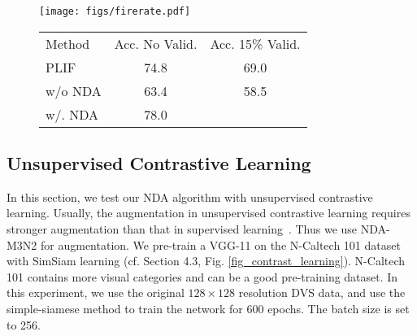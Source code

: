 \documentclass[runningheads]{llncs}
\newcommand{\bftab}{\fontseries{b}\selectfont}
\begin{document}
\begin{figure}[t]
\noindent\begin{minipage}{\textwidth}
\begin{minipage}{0.49\textwidth}
\centering
\texttt{[image: figs/firerate.pdf]}
\label{fig_fire}
\end{minipage}
\hfill
\begin{minipage}{0.49\textwidth}
\centering
{}
\centering
\begin{adjustbox}{max width=\linewidth}
\begin{tabular}[b]{l  c  c} 
\toprule
{{\bftab Method}} & {\bftab Acc. No Valid.} & {\bftab Acc. 15\% Valid.} \\
\noalign{\smallskip}
\hline
\noalign{\smallskip}
PLIF \cite{fang2021incorporating} & 74.8 & 69.0 \\ 
\noalign{\smallskip}
\hline
\noalign{\smallskip}
{\textcolor{myblue}{\bftab w/o NDA}} & 63.4 & 58.5 \\
{\textcolor{myred}{\bftab w/. NDA}} & 78.0 & {\bftab 74.4}\\
\bottomrule
\end{tabular}
\end{adjustbox}
\label{tab_val}
\end{minipage}
\end{minipage}
\end{figure}

\subsection{Unsupervised Contrastive Learning}
\label{sec_ssl}
In this section, we test our NDA algorithm with unsupervised contrastive learning. Usually, the augmentation in unsupervised contrastive learning requires stronger augmentation than that in supervised learning~\cite{chen2020simple}. Thus we use NDA-M3N2 for augmentation. We pre-train a VGG-11 on the N-Caltech 101 dataset with SimSiam learning (cf. Section 4.3, Fig. \ref{fig_contrast_learning}). N-Caltech 101 contains more visual categories and can be a good pre-training dataset.
In this experiment, we use the original $128\times 128$ resolution DVS data, and use the simple-siamese method to train the network for 600 epochs. The batch size is set to 256. 
\end{document}
